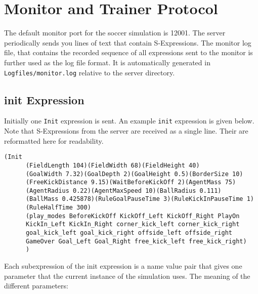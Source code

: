\section{Monitor and Trainer Protocol}

The default monitor port for the soccer simulation is 12001. The
server periodically sends you lines of text that contain
S-Expressions. The monitor log file, that contains the recorded
sequence of all expressions sent to the monitor is further used as the
log file format. It is automatically generated in
\texttt{Logfiles/monitor.log} relative to the server directory.

\subsection{init Expression}

Initially one \texttt{Init} expression is sent. An example
\texttt{init} expression is given below. Note that S-Expressions from
the server are received as a single line. Their are reformatted here
for readability.

\begin{verbatim}
(Init 
      (FieldLength 104)(FieldWidth 68)(FieldHeight 40)
      (GoalWidth 7.32)(GoalDepth 2)(GoalHeight 0.5)(BorderSize 10)
      (FreeKickDistance 9.15)(WaitBeforeKickOff 2)(AgentMass 75)
      (AgentRadius 0.22)(AgentMaxSpeed 10)(BallRadius 0.111)
      (BallMass 0.425878)(RuleGoalPauseTime 3)(RuleKickInPauseTime 1)
      (RuleHalfTime 300)
      (play_modes BeforeKickOff KickOff_Left KickOff_Right PlayOn
      KickIn_Left KickIn_Right corner_kick_left corner_kick_right
      goal_kick_left goal_kick_right offside_left offside_right
      GameOver Goal_Left Goal_Right free_kick_left free_kick_right)
      )
\end{verbatim}

Each subexpression of the init expression is a name value pair that
gives one parameter that the current instance of the simulation uses.
The meaning of the different parameters:

